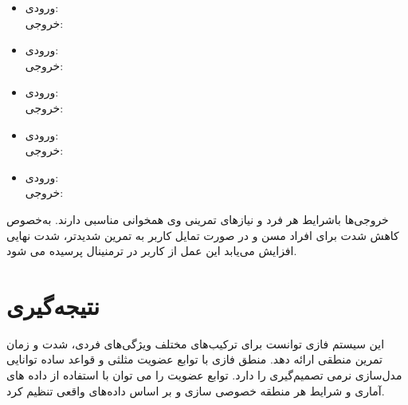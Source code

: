 \documentclass[12pt]{exam}
\begin{document}
	\begin{itemize}
		\item ورودی:
		\\
		خروجی:
		\item ورودی:
		\\
		خروجی:
		\item ورودی:
		\\
		خروجی:
		\item ورودی:
		\\
		خروجی:
		\item ورودی: 
		\\
		خروجی:
	\end{itemize}
	
	خروجی‌ها باشرایط هر فرد و نیازهای تمرینی وی همخوانی مناسبی دارند. به‌خصوص کاهش شدت برای افراد مسن و در صورت تمایل کاربر به تمرین شدیدتر، شدت نهایی افزایش می‌یابد این عمل از کاربر در ترمنینال پرسیده می شود.
	
	\section{نتیجه‌گیری}
	این سیستم فازی توانست برای ترکیب‌های مختلف ویژگی‌های فردی، شدت و زمان تمرین منطقی ارائه دهد. منطق فازی با توابع عضویت مثلثی و قواعد ساده توانایی مدل‌سازی نرمی تصمیم‌گیری را دارد. توابع عضویت را می توان با استفاده از داده های آماری و شرایط هر منطقه خصوصی سازی و بر اساس داده‌های واقعی تنظیم کرد.
\end{document}
